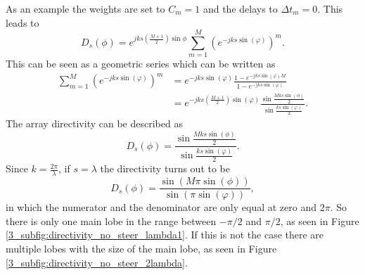 As an example the weights are set to $C_m = 1$ and the delays to $\Delta t_m = 0$. This leads to
\begin{equation}
   D_s(\phi)
    = 
    e^{jks\left ( \frac{M+1}{2} \right )\sin{\phi} } \sum_{m=1}^M \left ( e^{-jks \sin{(\varphi)}} \right ) ^ m .
\end{equation}
This can be seen as a geometric series which can be written as 
\begin{align}
   \sum_{m=1}^M \left ( e^{-jks \sin{(\varphi)}} \right ) ^ m
    &= 
     e^{-jks \sin{(\varphi)}}\frac{1 - e^{-jks \sin{(\varphi) M }}}{1 - e^{-jks \sin{(\varphi)}}} \\
     &=
     e^{-jks\left ( \frac{M + 1}{2}\right ) \sin{(\varphi)}} \frac{\sin{\frac{Mks\sin{(\phi)}}{2}}}{\sin{\frac{ks\sin{(\varphi)}}{2}}}.
\end{align}
The array directivity can be described as
\begin{equation}
    D_s(\phi) 
    = 
    \frac{\sin{\frac{Mks\sin{(\phi)}}{2}}}{\sin{\frac{ks\sin{(\varphi)}}{2}}}.
    \label{3_eq:directivity_no_delay}
\end{equation}
Since $k = \frac{2\pi}{\lambda}$, if $s = \lambda$ the directivity turns out to be
\begin{equation}
    D_s(\phi) 
    = 
    \frac{\sin{\left ( M\pi\sin{(\phi)} \right )} }{ \sin{\left ( \pi\sin{(\varphi)}\right )}},
\end{equation}
in which the numerator and the denominator are only equal at zero and $2\pi$. So there is only one main lobe in the range between $-\pi/2$ and $\pi/2$, as seen in Figure \ref{3_subfig:directivity_no_steer_lambda1}. If this is not the case there are multiple lobes with the size of the main lobe, as seen in Figure \ref{3_subfig:directivity_no_steer_2lambda}.
